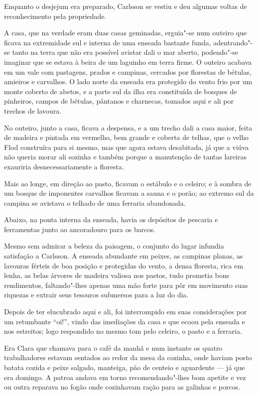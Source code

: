 Enquanto o desjejum era preparado, Carlsson se vestiu e deu algumas
voltas de reconhecimento pela propriedade.

A casa, que na verdade eram duas casas geminadas, erguia"-se num outeiro que
ficava na extremidade sul e interna de uma enseada bastante funda, adentrando"-se
tanto na terra que não era possível avistar dali o mar aberto, podendo"-se
imaginar que se estava à beira de um laguinho em terra firme. O outeiro acabava em um vale com
pastagens, prados e campinas, cercados por florestas de bétulas, amieiros e
carvalhos. O lado norte da enseada era protegido do vento frio por um monte
coberto de abetos, e a parte sul da ilha era constituída de bosques de pinheiros,
campos de bétulas, pântanos e charnecas, tomados aqui e ali por trechos de
lavoura.

No outeiro, junto a casa, ficava a despensa, e a um trecho dali a casa maior,
feita de madeira e pintada em vermelho, bem grande e coberta de telhas, que o
velho Flod construíra para si mesmo, mas que agora estava desabitada, já
que a viúva não queria morar ali sozinha e também porque a manutenção de tantas
lareiras exauriria desnecessariamente a floresta.

Mais ao longe, em direção ao pasto, ficavam o estábulo e o celeiro; e à sombra
de um bosque de imponentes carvalhos ficavam a sauna e o porão; ao extremo sul da
campina se avistava o telhado de uma ferraria abandonada.

Abaixo, na ponta interna da enseada, havia os depósitos de pescaria e
ferramentas junto ao ancoradouro para os barcos.

Mesmo sem admirar a beleza da paisagem, o conjunto do lugar infundia satisfação
a Carlsson. A enseada abundante em peixes, as campinas planas, as lavouras
férteis de boa posição e protegidas do vento, a densa floresta, rica em lenha,
as belas árvores de madeira valiosa nos pastos, tudo prometia bons rendimentos,
faltando"-lhes apenas uma mão forte para pôr em movimento suas riquezas e extrair
seus tesouros submersos para a luz do dia.

Depois de ter elucubrado aqui e ali, foi interrompido em suas
considerações por um retumbante ``oi!'', vindo das imediações da casa e que
ecoou pela enseada e nos estreitos; logo respondido no mesmo tom pelo celeiro, o
pasto e a ferraria.

Era Clara que chamava para o café da manhã e num instante os quatro
trabalhadores estavam sentados ao redor da mesa da cozinha, onde haviam posto
batata cozida e peixe salgado, manteiga, pão de centeio e aguardente --- já que era domingo. 
A patroa andava em torno recomendando"-lhes bom apetite e vez ou
outra reparava no fogão onde cozinhavam ração para as galinhas e porcos.

